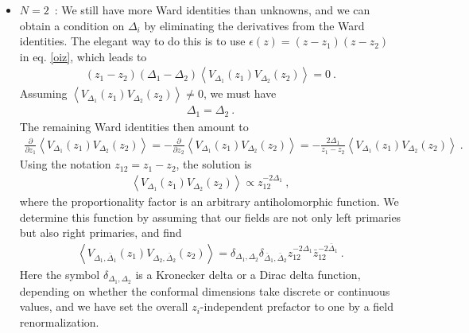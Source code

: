 \documentclass[12pt, a4paper, notitlepage, twoside]{report}
\numberwithin{equation}{section}
\theoremstyle{break}
\begin{document}
\begin{itemize}
\item $\boxed{N=2}$\ : We still have more Ward identities than unknowns, and we can obtain a condition on $\Delta_i$ by eliminating the derivatives from the Ward identities.
The elegant way to do this is to use $\epsilon(z)=(z-z_1)(z-z_2)$ in eq. \eqref{oiz}, which leads to 
\begin{align}
 (z_1-z_2)(\Delta_1-\Delta_2)\left\langle V_{\Delta_1}(z_1)V_{\Delta_2}(z_2)\right\rangle =0\ .
\end{align}
Assuming $\left\langle V_{\Delta_1}(z_1)V_{\Delta_2}(z_2)\right\rangle\neq 0$, we must have 
\begin{align}
 \Delta_1 = \Delta_2 \ . 
\label{ded}
\end{align}
The remaining Ward identities then amount to 
\begin{align}
 \frac{\partial}{\partial z_1}\left\langle V_{\Delta_1}(z_1)V_{\Delta_2}(z_2)\right\rangle = - \frac{\partial}{\partial z_2}\left\langle V_{\Delta_1}(z_1)V_{\Delta_2}(z_2)\right\rangle = -\frac{2\Delta_1}{z_1-z_2} \left\langle V_{\Delta_1}(z_1)V_{\Delta_2}(z_2)\right\rangle\ .
\end{align}
Using the notation $z_{12}=z_1-z_2$, the solution is
\begin{align}
 \left\langle V_{\Delta_1}(z_1)V_{\Delta_2}(z_2)\right\rangle \propto z_{12}^{-2\Delta_1}\ ,
 \label{fzz}
\end{align}
where the proportionality factor is an arbitrary antiholomorphic function. We determine this function by assuming that our fields are not only left primaries but also right primaries, and find
\begin{align}
 \boxed{ \left\langle V_{\Delta_1,\bar{\Delta}_1}(z_1) V_{\Delta_2,\bar{\Delta}_2}(z_2)\right\rangle = \delta_{\Delta_1,\Delta_2}\delta_{\bar{\Delta}_1,\bar{\Delta}_2} z_{12}^{-2\Delta_1}\bar z_{12}^{-2\bar \Delta_1} }\ .
 \label{eq:2pt}
\end{align}
Here the symbol $\delta_{\Delta_1,\Delta_2}$ is a Kronecker delta or a Dirac delta function, depending on whether the conformal dimensions take discrete or continuous values, and we have set the overall $z_i$-independent prefactor to one by a field renormalization.


\end{itemize}
\end{document}
